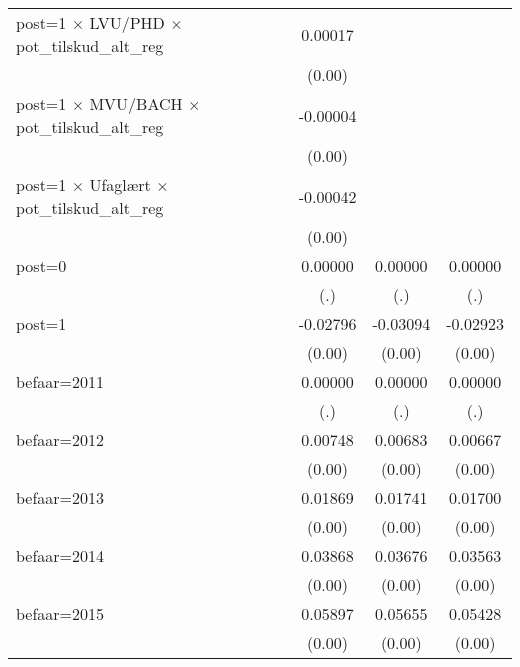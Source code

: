 \begin{table}[htbp]
\begin{tabular}{l*{3}{c}}
post=1 $\times$ LVU/PHD $\times$ pot\_tilskud\_alt\_reg&     0.00017\sym{***}&                     &                     \\
                    &      (0.00)         &                     &                     \\
post=1 $\times$ MVU/BACH $\times$ pot\_tilskud\_alt\_reg&    -0.00004\sym{*}  &                     &                     \\
                    &      (0.00)         &                     &                     \\
post=1 $\times$ Ufaglært $\times$ pot\_tilskud\_alt\_reg&    -0.00042\sym{***}&                     &                     \\
                    &      (0.00)         &                     &                     \\
post=0              &     0.00000         &     0.00000         &     0.00000         \\
                    &         (.)         &         (.)         &         (.)         \\
post=1              &    -0.02796\sym{***}&    -0.03094\sym{***}&    -0.02923\sym{***}\\
                    &      (0.00)         &      (0.00)         &      (0.00)         \\
befaar=2011         &     0.00000         &     0.00000         &     0.00000         \\
                    &         (.)         &         (.)         &         (.)         \\
befaar=2012         &     0.00748\sym{***}&     0.00683\sym{***}&     0.00667\sym{***}\\
                    &      (0.00)         &      (0.00)         &      (0.00)         \\
befaar=2013         &     0.01869\sym{***}&     0.01741\sym{***}&     0.01700\sym{***}\\
                    &      (0.00)         &      (0.00)         &      (0.00)         \\
befaar=2014         &     0.03868\sym{***}&     0.03676\sym{***}&     0.03563\sym{***}\\
                    &      (0.00)         &      (0.00)         &      (0.00)         \\
befaar=2015         &     0.05897\sym{***}&     0.05655\sym{***}&     0.05428\sym{***}\\
                    &      (0.00)         &      (0.00)         &      (0.00)         \\

\end{tabular}
\end{table}
